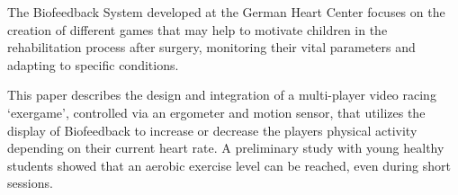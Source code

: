 The Biofeedback System developed at the German Heart Center focuses on the creation of different games that may help to motivate children in the rehabilitation process after surgery, monitoring their vital parameters and adapting to specific conditions.

This paper describes the design and integration of a multi-player video racing ‘exergame’,  controlled via an ergometer and motion sensor, that utilizes the display of Biofeedback to increase or decrease the players physical activity depending on their current heart rate. A preliminary study with young healthy students showed that an aerobic exercise level can be reached, even during short sessions.
\cite{Goe2010}
